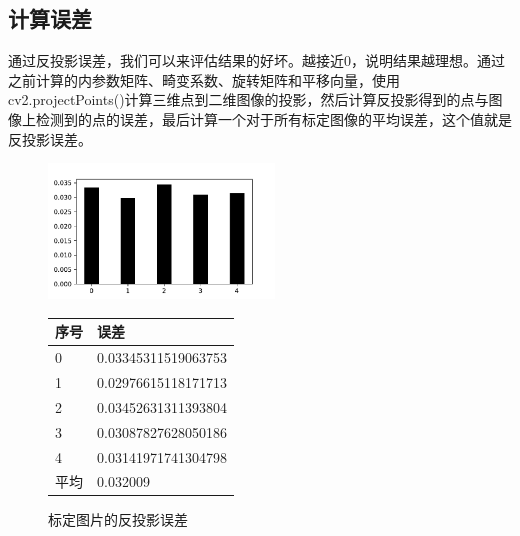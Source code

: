 \documentclass[]{article}
\begin{document}
    \subsection{计算误差}
    通过反投影误差，我们可以来评估结果的好坏。越接近0，说明结果越理想。通过之前计算的内参数矩阵、畸变系数、旋转矩阵和平移向量，使用cv2.projectPoints()计算三维点到二维图像的投影，然后计算反投影得到的点与图像上检测到的点的误差，最后计算一个对于所有标定图像的平均误差，这个值就是反投影误差。
    \begin{figure}[htbp]
        \centering
        \begin{minipage}[h]{0.4\textwidth}
            \centering
            \includegraphics[width=6cm]{./errors.pdf}
        \end{minipage}
        \begin{minipage}[h]{0.4\textwidth}
            \centering
            \begin{tabular}{ll} %
                \toprule
                序号 & 误差\\
                \midrule
                0 & 0.03345311519063753\\
                1 & 0.02976615118171713\\
                2 & 0.03452631311393804\\
                3 & 0.03087827628050186\\
                4 & 0.03141971741304798\\
                \midrule
                平均 & 0.032009\\
                \bottomrule
            \end{tabular}
        \end{minipage}
        \caption{标定图片的反投影误差}
    \end{figure}
\end{document}
